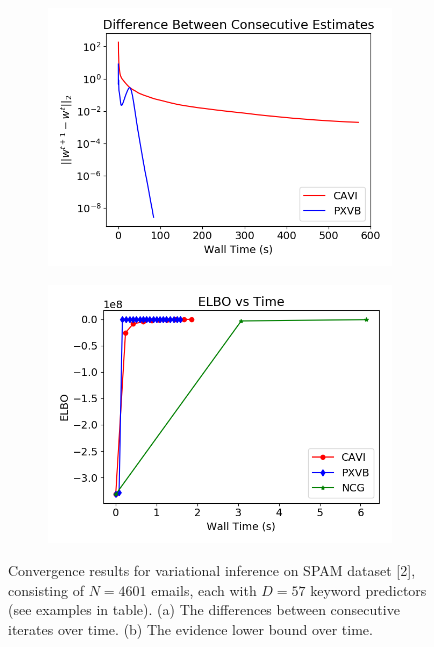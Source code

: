 \documentclass{article}
\begin{document}
\begin{figure}[tb]
        \begin{subfigure}[t]{0.49\textwidth}
        \includegraphics[width=\textwidth]{Probit_real/CAVI_PX_convergence.png}
        \subcaption{}
    \end{subfigure}
          \begin{subfigure}[t]{0.49\textwidth}
        \includegraphics[width=\textwidth]{Probit_real/elbo_time.png}
        \subcaption{}
    \end{subfigure}
    \caption{Convergence results for variational inference on SPAM dataset [2], consisting of $N= 4601$ emails, each with $D=57$ keyword predictors (see examples in table). (a) The differences between consecutive iterates over time. (b) The evidence lower bound over time. } %
    \label{fig:Probit_spam}
\end{figure}
\end{document}
